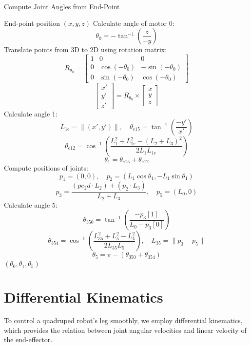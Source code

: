 \documentclass[a4paper,11pt]{article}
\begin{document}
\begin{algorithm}[H]
	\caption{Compute Joint Angles from End-Point}
	\begin{algorithmic}[1]
			\Require End-point position $(x, y, z)$
			\State Calculate angle of motor 0:
			$$
				\theta_0 = -\tan^{-1} \left( \frac{z}{-y} \right)
			$$
			\State Translate points from 3D to 2D using rotation matrix:
			$$
				R_{\theta_0} =
					\begin{bmatrix}
							1 & 0 & 0 \\
							0 & \cos(-\theta_0) & -\sin(-\theta_0) \\
							0 & \sin(-\theta_0) & \cos(-\theta_0)
					\end{bmatrix}
			$$
			$$
				\begin{bmatrix} x' \\ y' \\ z' \end{bmatrix} = R_{\theta_0} \times \begin{bmatrix} x \\ y \\ z \end{bmatrix}
			$$
			\State Calculate angle 1:
			$$
					L_{1e} = \| (x', y') \|, \quad
					\theta_{e15} = \tan^{-1} \left( \frac{-y'}{x'} \right)
			$$
			$$
					\theta_{e12} = \cos^{-1} \left( \frac{L_1^2 + L_{1e}^2 - (L_2 + L_3)^2}{2 L_1 L_{1e}} \right)
			$$
			$$
					\theta_1 = \theta_{e15} + \theta_{e12}
			$$
			\State Compute positions of joints:
			$$
					p_1 = (0, 0), \quad
					p_2 = (L_1 \cos \theta_1, -L_1 \sin \theta_1)
			$$
			$$
					p_3 = \frac{(pe_2d \cdot L_2) + (p_2 \cdot L_3)}{L_2 + L_3}, \quad
					p_5 = (L_0, 0)
			$$
			\State Calculate angle 5:
			$$
				\theta_{350} = \tan^{-1} \left( \frac{-p_3[1]}{L_0 - p_3[0]} \right)
			$$
			$$
					\theta_{354} = \cos^{-1} \left( \frac{L_{35}^2 + L_5^2 - L_4^2}{2 L_{35} L_5} \right), \quad
					L_{35} = \| p_3 - p_5 \|
			$$
			$$
					\theta_5 = \pi - (\theta_{350} + \theta_{354})
			$$
			\State \Return $(\theta_0, \theta_1, \theta_5)$
	\end{algorithmic}
\end{algorithm}

\section{Differential Kinematics}

To control a quadruped robot's leg smoothly, we employ differential kinematics, which provides the relation between joint angular velocities and linear velocity of the end-effector.
\end{document}
